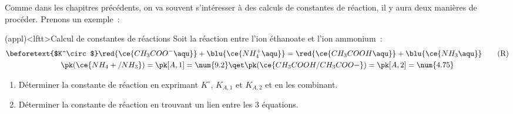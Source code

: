 \documentclass[../../main/main.tex]{subfiles}
\begin{document}
Comme dans les chapitres précédents, on va souvent s'intéresser à des calculs de
constantes de réaction, il y aura deux manières de procéder. Prenons un
exemple~:
\begin{tcb*}[breakable](appl)<lftt>{Calcul de constantes de réactions}
	Soit la réaction entre l'ion éthanoate et l'ion ammonium~:
	\begin{gather*}
		\beforetext{$K^\circ$}
		\red{\ce{CH_3COO^-\aqu}} + \blu{\ce{NH_4^+\aqu}}
		=
		\red{\ce{CH_3COOH\aqu}} + \blu{\ce{NH_3\aqu}}
		\tag{R}
		\label{eq:R}
		\\
		\pk(\ce{NH_4+/NH_3}) = \pk[A,1] = \num{9.2}
		\qet
		\pk(\ce{CH_3COOH/CH_3COO-}) = \pk[A,2] = \num{4.75}
	\end{gather*}
	\begin{enumerate}[label=\sqenumi]
		\item Déterminer la constante de réaction en exprimant $K^\circ$, $K_{A,1}$
		      et $K_{A,2}$ et en les combinant.
		\item Déterminer la constante de réaction en trouvant un lien entre les 3
		      équations.
	\end{enumerate}
	\tcblower
	\begin{enumerate}[label=\sqenumi]
		\mitem {}
		\mitem {}
		\vspace{-15pt}
	\end{enumerate}
\end{tcb*}
\end{document}
